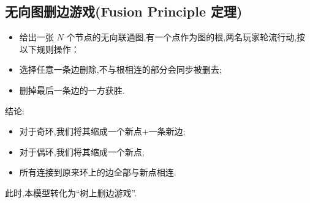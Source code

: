 \subsection{无向图删边游戏(Fusion Principle 定理)}
\begin{itemize}
    \item 给出一张 $N$ 个节点的无向联通图,有一个点作为图的根,两名玩家轮流行动,按以下规则操作：
    \item 选择任意一条边删除,不与根相连的部分会同步被删去;
    \item 删掉最后一条边的一方获胜.
\end{itemize}

结论:
\begin{itemize}
    \item 对于奇环,我们将其缩成一个新点+一条新边;
    \item 对于偶环,我们将其缩成一个新点;
    \item 所有连接到原来环上的边全部与新点相连.
\end{itemize}
此时,本模型转化为“树上删边游戏”.